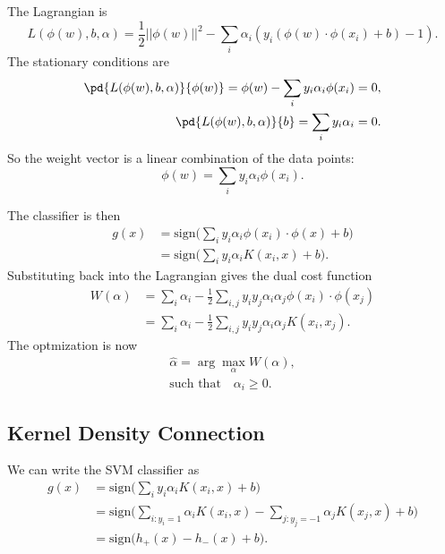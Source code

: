 \documentclass{article}
\begin{document}
The Lagrangian is
\begin{equation}
L(\phi(w),b,\alpha) = \frac{1}{2}||\phi(w)||^2 - \sum_i \alpha_i (y_i (\phi(w) \cdot \phi(x_i) + b) - 1).
\end{equation}
The stationary conditions are
\begin{align}
\pd{L(\phi(w),b,\alpha)}{\phi(w)} = \phi(w) - \sum_i y_i \alpha_i \phi(x_i) = 0,\\
\pd{L(\phi(w),b,\alpha)}{b} = \sum_i y_i \alpha_i = 0.
\end{align}
So the weight vector is a linear combination of the data points:
\begin{equation}
\phi(w) = \sum_i y_i \alpha_i \phi(x_i).
\end{equation}

The classifier is then
\begin{align}
g(x) & = \text{sign}\bigg(\sum_i y_i \alpha_i \phi(x_i) \cdot \phi(x) + b\bigg) \\
& = \text{sign}\bigg(\sum_i y_i \alpha_i K(x_i,x) + b\bigg).
\end{align}
Substituting back into the Lagrangian gives the dual cost function
\begin{align}
W(\alpha) & = \sum_i \alpha_i - \frac{1}{2} \sum_{i,j} y_i y_j \alpha_i \alpha_j \phi(x_i) \cdot \phi(x_j) \\
& = \sum_i \alpha_i - \frac{1}{2} \sum_{i,j} y_i y_j \alpha_i \alpha_j K(x_i,x_j).
\end{align}
The optmization is now
\begin{align}
\hat{\alpha} = \arg \max_\alpha W(\alpha), \\
\text{such that} \quad \alpha_i \ge 0.
\end{align}

\subsection{Kernel Density Connection}
We can write the SVM classifier as
\begin{align}
g(x) & = \text{sign}\bigg(\sum_i y_i \alpha_i K(x_i,x) + b\bigg) \\
& = \text{sign} \bigg(\sum_{i:y_i=1} \alpha_i K(x_i,x) - \sum_{j:y_j=-1} \alpha_j K(x_j,x) + b\bigg) \\
& = \text{sign} \bigg(h_+(x) - h_-(x) + b\bigg).
\end{align}
\end{document}
